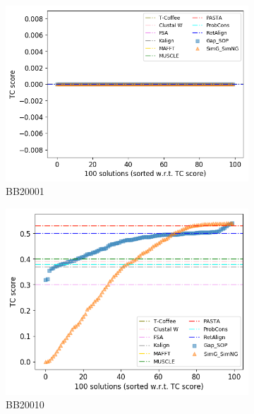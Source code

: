 \begin{figure}[!htbp]
	\centering
	\begin{adjustwidth}{-1cm}{-1cm}
		\begin{subfigure}{0.22\textwidth}
			\includegraphics[width=\columnwidth]{Figure/summary/precomputedInit/Balibase/BB20001_tc_density_single_run_2}
			\caption{BB20001}
		\end{subfigure}	
		\begin{subfigure}{0.22\textwidth}
			\includegraphics[width=\columnwidth]{Figure/summary/precomputedInit/Balibase/BB20010_tc_density_single_run_2}
			\caption{BB20010}
		\end{subfigure}
		\begin{subfigure}{0.22\textwidth}

\end{subfigure}
\end{adjustwidth}
\end{figure}
